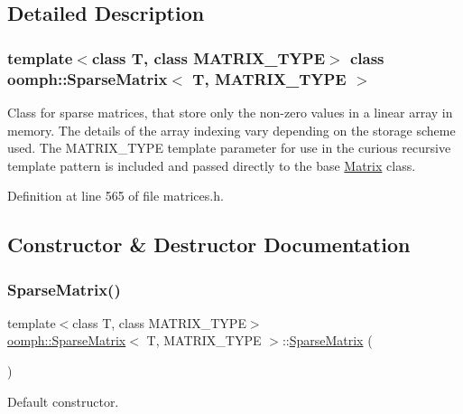 \subsection{Detailed Description}
\subsubsection*{template$<$class T, class M\+A\+T\+R\+I\+X\+\_\+\+T\+Y\+PE$>$\newline
class oomph\+::\+Sparse\+Matrix$<$ T, M\+A\+T\+R\+I\+X\+\_\+\+T\+Y\+P\+E $>$}

Class for sparse matrices, that store only the non-\/zero values in a linear array in memory. The details of the array indexing vary depending on the storage scheme used. The M\+A\+T\+R\+I\+X\+\_\+\+T\+Y\+PE template parameter for use in the curious recursive template pattern is included and passed directly to the base \hyperlink{classoomph_1_1Matrix}{Matrix} class. 

Definition at line 565 of file matrices.\+h.



\subsection{Constructor \& Destructor Documentation}
\mbox{\label{classoomph_1_1SparseMatrix_a9aff0ae09aadbc704580726a53fe51c5}} 
\subsubsection{\texorpdfstring{Sparse\+Matrix()}{SparseMatrix()}\hspace{0.1cm}{\footnotesize\ttfamily [1/2]}}
{\footnotesize\ttfamily template$<$class T, class M\+A\+T\+R\+I\+X\+\_\+\+T\+Y\+PE$>$ \\
\hyperlink{classoomph_1_1SparseMatrix}{oomph\+::\+Sparse\+Matrix}$<$ T, M\+A\+T\+R\+I\+X\+\_\+\+T\+Y\+PE $>$\+::\hyperlink{classoomph_1_1SparseMatrix}{Sparse\+Matrix} (\begin{DoxyParamCaption}{ }\end{DoxyParamCaption})\hspace{0.3cm}{\ttfamily [inline]}}



Default constructor. 



